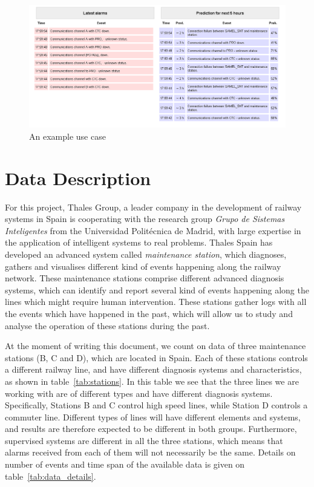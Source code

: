 \begin{figure}[hbtp]
\includegraphics[width=\textwidth]{img/demo_thales.png}
\caption{An example use case} \label{fig:demo_view}
\end{figure}

\section{Data Description}
For this project, Thales Group, a leader company in the development of railway systems in Spain is cooperating with the research group {\it Grupo de Sistemas Inteligentes} from the Universidad Politécnica de Madrid, with large expertise in the application of intelligent systems to real problems. Thales Spain has developed an advanced system called \emph{maintenance station}, which diagnoses, gathers and visualises different kind of events happening along the railway network. These maintenance stations comprise different advanced diagnosis systems, which can identify and report several kind of events happening along the lines which might require human intervention. These stations gather logs with all the events which have happened in the past, which will allow us to study and analyse the operation of these stations during the past.

At the moment of writing this document, we count on data of three maintenance stations (B, C and D), which are located in Spain. Each of these stations controls a different railway line, and have different diagnosis systems and characteristics, as shown in table~\ref{tab:stations}. In this table we see that the three lines we are working with are of different types and have different diagnosis systems. Specifically, Stations B and C control high speed lines, while Station D controls a commuter line. Different types of lines will have different elements and systems, and results are therefore expected to be different in both groups. Furthermore, supervised systems are different in all the three stations, which means that alarms received from each of them will not necessarily be the same. Details on number of events and time span of the available data is given on table~\ref{tab:data_details}.

